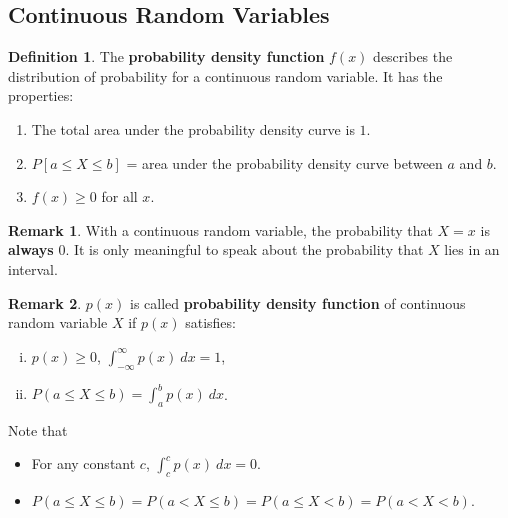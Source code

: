 \documentclass[12pt,openany]{book}
\theoremstyle{definition}
\newtheorem{definition}{Definition}[chapter]
\newtheorem{remark}{Remark}[chapter]
\newcommand{\dispsty}{\displaystyle}
\begin{document}
	\subsection{Continuous Random Variables}
	\begin{tcolorbox}[colback=white,colframe=defcolor,arc=5pt,title={\color{white}\bf Probability Density Function}]
		\begin{definition}
			The \textbf{probability density function} $f(x)$ describes the distribution of probability for a continuous random variable. It has the properties: \begin{enumerate}[(1)]
				\item The total area under the probability density curve is $1$.
				\item $P[a\leq X\leq b]$ = area under the probability density curve between $a$ and $b$.
				\item $f(x)\geq 0$ for all $x$.
			\end{enumerate}
		\end{definition}
	\end{tcolorbox}
	\begin{remark}
		With a continuous random variable, the probability that $X=x$ is \textbf{always} 0. It is only meaningful to speak about the probability that $X$ lies in an interval.
	\end{remark}
	\begin{remark}
		$p(x)$ is called \textbf{probability density function} of continuous random variable $X$ if $p(x)$ satisfies: \begin{enumerate}[(i)]
			\item $p(x)\geq 0$, $\dispsty\int_{-\infty}^{\infty}p(x)\ dx=1$,
			\item $P(a\leq X\leq b)=\dispsty\int_{a}^bp(x)\ dx$.
		\end{enumerate}
		Note that
		\begin{itemize}
			\item For any constant $c$, $\dispsty\int_{c}^cp(x)\ dx=0$.
			\item $P(a\leq X\leq b)=P(a< X\leq b)=P(a\leq X< b)=P(a< X< b)$.
		\end{itemize}
	\end{remark}
	\vspace{10pt}
\end{document}
